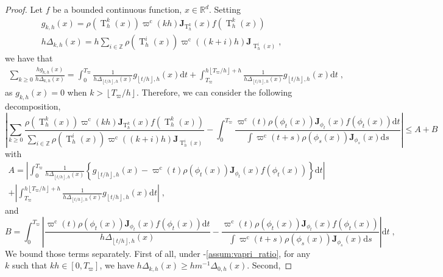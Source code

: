 \documentclass{article}
\def\transfo{\operatorname{T}}
\def\rmd{\operatorname{d}\hspace{-2pt}}
\def\rset{\mathbb{R}}
\def\rmd{\mathrm{d}}
\def\eqsp{\,}
\def\eqsp{\;}
\newcommand{\ccint}[1]{\left[#1\right]}
\newcommand{\1}{\mathds{1}}
\def\proposal{\rho}
\def\Jac{\mathbf{J}}
\newcommand{\JacOp}[1]{\Jac_{#1}}
\def\rset{\mathbb{R}}
\def\zset{\mathbb{Z}}
\def\rmd{\mathrm{d}}
\def\varpic{\varpi^{\mathrm{c}}}
\newcommand{\partint}[1]{ \left \lfloor #1 \right \rfloor}
\def\Tvarpi{T_\varpi}
\begin{document}
  \begin{proof}
    Let $f$ be a  bounded continuous function, $x\in\rset^d$.
Setting
 \begin{align*}
 & g_{k,h}(x) = \rho(\transfo_h^k(x))\varpic(kh)\JacOp{\transfo_h^k}(x)f(\transfo_h^k(x))\\
    & h\Delta_{k,h}(x) = h\sum_{i\in\zset}  \proposal(\transfo_h^i(x))\varpic((k+i)h) \JacOp{\transfo_h^i(x)}\eqsp,
 \end{align*}
we have that 
 \begin{align*}
   \sum_{k\geq 0} \frac{hg_{k,h}(x)}{h\Delta_{k,h}(x)}  =\int_0^{\Tvarpi} \frac{1}{h\Delta_{\partint{t/h},h}(x)}  g_{\partint{t/h}, h}(x)\rmd t +\int_{\Tvarpi}^{h\partint{\Tvarpi/h}+h}\frac{1}{h\Delta_{\partint{t/h},h}(x)}  g_{\partint{t/h}, h}(x)\rmd t\eqsp,
 \end{align*}
 as $g_{k,h}(x) = 0$ when $k>\partint{\Tvarpi/h}$.
Therefore,  we can consider the following decomposition,
   \begin{equation*}
       \left\vert \sum_{k\geq 0}\frac{\rho(\transfo_h^k(x))\varpic(kh)\JacOp{\transfo_h^k}(x)f(\transfo_h^k(x))}{\sum_{i\in\zset} \proposal(\transfo_h^i(x))\varpic((k+i)h) \JacOp{\transfo_h^i(x)}} - \int_0^{\Tvarpi}\frac{\varpic(t)\proposal(\phi_t(x))\JacOp{\phi_t}(x) f(\phi_t(x))\rmd t}{\int\varpic(t+s) \proposal(\phi_s(x))\JacOp{\phi_s}(x) \rmd s}\right\vert \leq A + B
   \end{equation*}
   with
   \begin{multline*}
       A  = \left\vert\int_0^{\Tvarpi} \frac{1}{h\Delta_{\partint{t/h},h}(x)}  \left\{ g_{\partint{t/h}, h}(x) - \varpic(t)\proposal(\phi_t(x))\JacOp{\phi_t}(x)f(\phi_t(x))\right\} \rmd t\right\vert\\
      + \left\vert \int_{\Tvarpi}^{h\partint{\Tvarpi/h}+h}\frac{1}{h\Delta_{\partint{t/h},h}(x)}   g_{\partint{t/h}, h}(x)\rmd t\right\vert\eqsp,
   \end{multline*}
 and 
    \begin{equation*}
    B =  \int_0^{\Tvarpi}\left\vert\frac{\varpic(t)\proposal(\phi_t(x))\JacOp{\phi_t}(x)f(\phi_t(x)) \rmd t}{h\Delta_{\partint{t/h},h}(x)} -  \frac{\varpic(t)\proposal(\phi_t(x))\JacOp{\phi_t}(x) f(\phi_t(x))}{\int\varpic(t+s) \proposal(\phi_s(x))\JacOp{\phi_s}(x) \rmd s}\right\vert \rmd t\eqsp,
    \end{equation*}
 We bound those terms separately. First of all, under -\ref{assum:vapri_ratio}, for any $k$ such that $kh\in\ccint{0, \Tvarpi}$, we have  $h\Delta_{k,h}(x) \geq hm^{-1}\Delta_{0,h}(x)$. Second,  

\end{proof}
\end{document}
